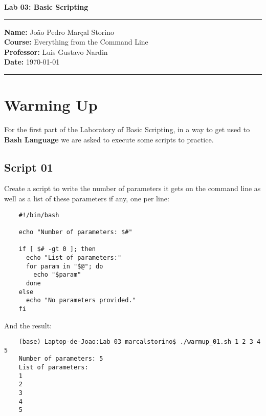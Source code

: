 \documentclass[a4paper, 12pt]{article}
\begin{document}
\vspace{0.5cm} %
\begin{center}
    {\LARGE \textbf{Lab 03: Basic Scripting}} %
\end{center}

\noindent\rule{\textwidth}{0.4mm} %

\begin{flushleft}
\textbf{Name:} João Pedro Marçal Storino \\
\textbf{Course:} Everything from the Command Line \\
\textbf{Professor:} Luis Gustavo Nardin \\ 
\textbf{Date:} \today
\end{flushleft}

\noindent\rule{\textwidth}{0.4mm} %

\section{Warming Up}
For the first part of the Laboratory of Basic Scripting, in a way to get used to \textbf{Bash Language}
we are asked to execute some scripts to practice.

\subsection{Script 01}
Create a script to write the number of parameters it gets on the command line as well as a list of these parameters if any, one per line:

\begin{lstlisting}
    #!/bin/bash

    echo "Number of parameters: $#"
    
    if [ $# -gt 0 ]; then
      echo "List of parameters:"
      for param in "$@"; do
        echo "$param"
      done
    else
      echo "No parameters provided."
    fi
\end{lstlisting}

And the result:

\begin{lstlisting}
    (base) Laptop-de-Joao:Lab 03 marcalstorino$ ./warmup_01.sh 1 2 3 4 5
    Number of parameters: 5
    List of parameters:
    1
    2
    3
    4
    5
\end{lstlisting}

\end{document}
